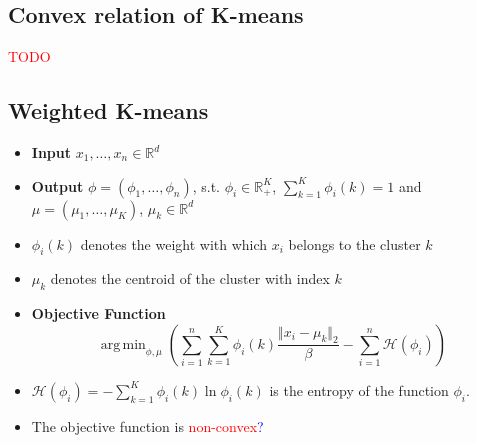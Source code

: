 \documentclass{article}
\DeclareMathOperator*{\argmin}{arg\,min}
\newcommand{\red}[1]{\textcolor{red}{#1}}
\newcommand{\blue}[1]{\textcolor{blue}{#1}}
\begin{document}
\subsection{Convex relation of K-means}
\red{TODO}


\subsection{Weighted K-means}

\begin{itemize}
    \item \textbf{Input} $x_1, \dots, x_n \in \mathbb{R}^d$
    \item \textbf{Output} $\phi=(\phi_1, \dots, \phi_n)$, s.t. $\phi_i \in \mathbb{R}^K_+$, $\sum_{k=1}^K\phi_i(k)=1$ and $\mu=(\mu_1, \dots, \mu_K)$, $\mu_k \in \mathbb{R}^d$
    \item $\phi_i(k)$ denotes the weight with which $x_i$ belongs to the cluster $k$
    \item $\mu_k$ denotes the centroid of the cluster with index $k$
    \item \textbf{Objective Function} $$\argmin_{\phi, \mu} \left( \sum_{i=1}^n \sum_{k=1}^K \phi_i(k) \frac{\Vert x_i-\mu_k \Vert_2}{\beta} - \sum_{i=1}^n\mathcal{H}(\phi_i) \right)$$
    \item $\mathcal{H}(\phi_i) = -\sum_{k=1}^K \phi_i(k)\ln{\phi_i(k)}$ is the entropy of the function $\phi_i$.
    \item The objective function is \red{non-convex}\blue{?}
\end{itemize}
\end{document}

